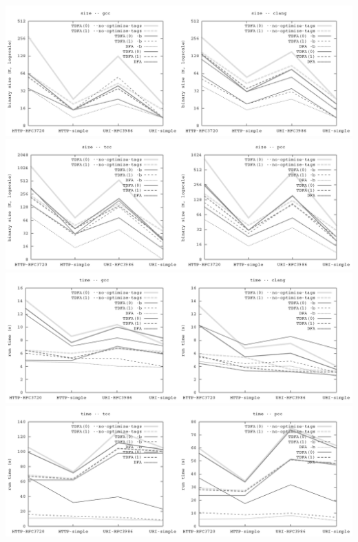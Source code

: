 \documentclass{article}
\theoremstyle{definition}
\begin{document}
\includegraphics[width=\linewidth]{img/bench/size_gcc_clang.png}
\includegraphics[width=\linewidth]{img/bench/size_tcc_pcc.png}
\includegraphics[width=\linewidth]{img/bench/time_gcc_clang.png}
\includegraphics[width=\linewidth]{img/bench/time_tcc_pcc.png}
\end{document}
